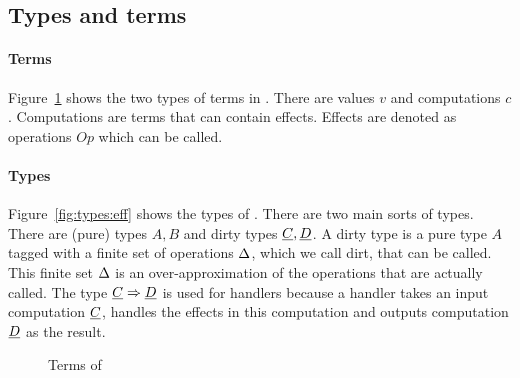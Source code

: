 \subsection{Types and terms}

\paragraph{Terms}
Figure~\ref{fig:terms:eff} shows the two types of terms in \eff. There are values $v$ and computations $c$. Computations are terms that can contain effects. Effects are denoted as operations $Op$ which can be called.

\paragraph{Types}
Figure~\ref{fig:types:eff} shows the types of \eff. There are two main sorts of types. There are (pure) types $A, B$ and dirty types $\underline{C}, \underline{D}$. A dirty type is a pure type $A$ tagged with a finite set of operations $\Delta$, which we call dirt, that can be called. This finite set $\Delta$ is an over-approximation of the operations that are actually called. The type $\underline{C} \Rightarrow \underline{D}$ is used for handlers because a handler takes an input computation $\underline{C}$, handles the effects in this computation and outputs computation $\underline{D}$ as the result.

\begin{figure}[h]
\begin{center}
\end{center}
\caption{Terms of \eff}\label{fig:terms:eff}
\end{figure}

